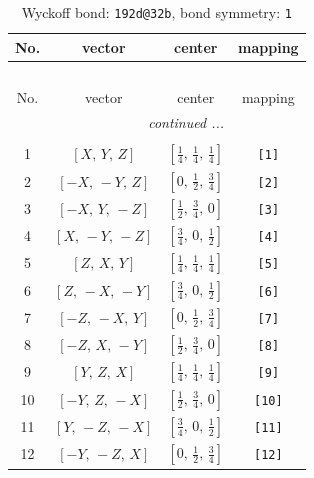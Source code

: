 \documentclass[fleqn,8pt]{jsarticle}
\begin{document}
\begin{longtable}{cccc}
\caption{Wyckoff bond: {\tt 192d@32b}, bond symmetry: {\tt 1}}
 \\
 \hline \hline
No. & vector & center & mapping \\ \hline \endfirsthead

\multicolumn{3}{l}{\tablename\ \thetable{}} \\
 \hline \hline
No. & vector & center & mapping \\ \hline \endhead

 \hline \hline
\multicolumn{3}{r}{\footnotesize\it continued ...} \\ \endfoot

 \hline \hline
\multicolumn{3}{r}{} \\ \endlastfoot

1 & $\left[ X,\, Y,\, Z \right]$ & $\left[ \frac{1}{4},\, \frac{1}{4},\, \frac{1}{4} \right]$ & {\tt [1]} \\ \hline
2 & $\left[ - X,\, - Y,\, Z \right]$ & $\left[ 0,\, \frac{1}{2},\, \frac{3}{4} \right]$ & {\tt [2]} \\ \hline
3 & $\left[ - X,\, Y,\, - Z \right]$ & $\left[ \frac{1}{2},\, \frac{3}{4},\, 0 \right]$ & {\tt [3]} \\ \hline
4 & $\left[ X,\, - Y,\, - Z \right]$ & $\left[ \frac{3}{4},\, 0,\, \frac{1}{2} \right]$ & {\tt [4]} \\ \hline
5 & $\left[ Z,\, X,\, Y \right]$ & $\left[ \frac{1}{4},\, \frac{1}{4},\, \frac{1}{4} \right]$ & {\tt [5]} \\ \hline
6 & $\left[ Z,\, - X,\, - Y \right]$ & $\left[ \frac{3}{4},\, 0,\, \frac{1}{2} \right]$ & {\tt [6]} \\ \hline
7 & $\left[ - Z,\, - X,\, Y \right]$ & $\left[ 0,\, \frac{1}{2},\, \frac{3}{4} \right]$ & {\tt [7]} \\ \hline
8 & $\left[ - Z,\, X,\, - Y \right]$ & $\left[ \frac{1}{2},\, \frac{3}{4},\, 0 \right]$ & {\tt [8]} \\ \hline
9 & $\left[ Y,\, Z,\, X \right]$ & $\left[ \frac{1}{4},\, \frac{1}{4},\, \frac{1}{4} \right]$ & {\tt [9]} \\ \hline
10 & $\left[ - Y,\, Z,\, - X \right]$ & $\left[ \frac{1}{2},\, \frac{3}{4},\, 0 \right]$ & {\tt [10]} \\ \hline
11 & $\left[ Y,\, - Z,\, - X \right]$ & $\left[ \frac{3}{4},\, 0,\, \frac{1}{2} \right]$ & {\tt [11]} \\ \hline
12 & $\left[ - Y,\, - Z,\, X \right]$ & $\left[ 0,\, \frac{1}{2},\, \frac{3}{4} \right]$ & {\tt [12]} \\ \hline

\end{longtable}
\end{document}
